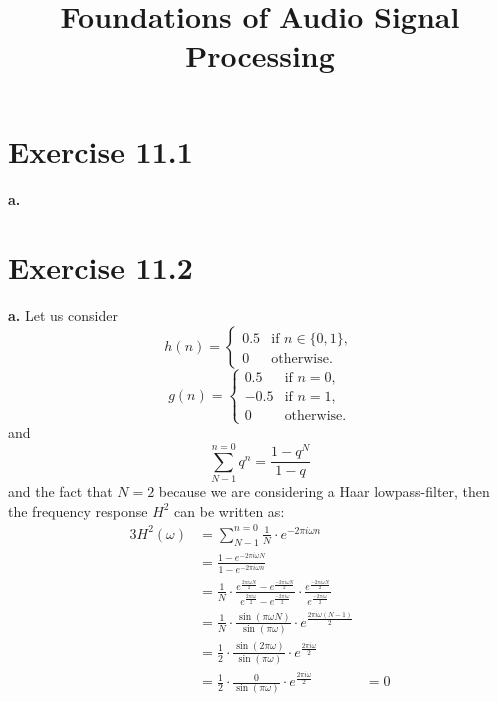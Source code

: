 \documentclass[12pt]{article}
\title{Foundations of Audio Signal Processing\\ \ass}
\author{\auth}
\newcommand{\een}{\ensuremath{e^{-2\pi i \omega n}}}
\begin{document}
	\maketitle
	\section*{Exercise 11.1}
	\textbf{a.}
	\section*{Exercise 11.2}
	\textbf{a.} Let us consider
	\begin{equation*}
	h(n) = 
	\begin{cases} 
	0.5 &\text{if } n \in \{0,1\},\\
	0 & \text{otherwise}.
	\end{cases}
	\end{equation*}
	\begin{equation*}
	g(n) = 
	\begin{cases} 
	0.5 &\text{if } n = 0,\\
	- 0.5 &\text{if } n = 1,\\
	0 & \text{otherwise}.
	\end{cases}
	\end{equation*}
	and 
	\begin{equation*}
		\sum_{N-1}^{n=0} q^n = \frac{1-q^N}{1-q}
	\end{equation*}
	and the fact that $N=2$ because we are considering a Haar lowpass-filter, then the frequency response $H^2$ can be written as:
	\begin{alignat*}{3}
		H^2 (\omega) &= \sum_{N-1}^{n=0} \frac{1}{N} \cdot \een\\
		&= \frac{1-e^{-2\pi i \omega N}}{1 - e^{-2\pi i \omega n}}\\
		&= \frac{1}{N} \cdot \frac{e^\frac{2\pi i \omega N}{2} - e^\frac{-2\pi i \omega N}{2}}{e^\frac{2\pi i \omega}{2} - e^\frac{-2\pi i \omega}{2}} \cdot \frac{e^\frac{-2\pi i \omega N}{2}}{e^\frac{-2\pi i \omega}{2}}\\
		&= \frac{1}{N} \cdot \frac{\sin(\pi \omega N)}{\sin(\pi \omega)} \cdot e^\frac{2\pi i \omega (N-1)}{2}\\
		&= \frac{1}{2} \cdot \frac{\sin(2\pi \omega)}{\sin(\pi \omega)} \cdot e^\frac{2\pi i \omega}{2}\\
		&= \frac{1}{2} \cdot \frac{0}{\sin(\pi \omega)} \cdot e^\frac{2\pi i \omega}{2} &= 0
	\end{alignat*}
\end{document}
